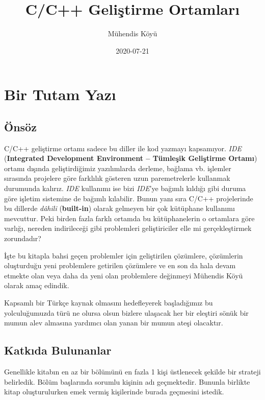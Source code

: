\documentclass[
]{book}
\title{C/C++ Geliştirme Ortamları}
\author{Mühendis Köyü}
\date{2020-07-21}
\begin{document}
\maketitle

{
\setcounter{tocdepth}{1}
\tableofcontents
}
\hypertarget{bir-tutam-yazux131}{%
\chapter{Bir Tutam Yazı}\label{bir-tutam-yazux131}}

\hypertarget{uxf6nsuxf6z}{%
\section{Önsöz}\label{uxf6nsuxf6z}}

C/C++ geliştirme ortamı sadece bu diller ile kod yazmayı kapsamıyor. \emph{IDE} (\textbf{Integrated Development Environment -- Tümleşik Geliştirme Ortamı}) ortamı dışında geliştirdiğimiz yazılımlarda derleme, bağlama vb. işlemler sırasında projelere göre farklılık gösteren uzun paremetrelerle kullanmak durumunda kalırız. \emph{IDE} kullanımı ise bizi \emph{IDE}'ye bağımlı kıldığı gibi duruma göre işletim sistemine de bağımlı kılabilir. Bunun yanı sıra C/C++ projelerinde bu dillerde \emph{dâhili} (\textbf{built-in}) olarak gelmeyen bir çok kütüphane kullanımı mevcuttur. Peki birden fazla farklı ortamda bu kütüphanelerin o ortamlara göre varlığı, nereden indirileceği gibi problemleri geliştiriciler elle mi gerçekleştirmek zorundadır?

İşte bu kitapla bahsi geçen problemler için geliştirilen çözümlere, çözümlerin oluşturduğu yeni problemlere getirilen çözümlere ve en son da hala devam etmekte olan veya daha da yeni olan problemlere değinmeyi Mühendis Köyü olarak amaç edindik.

Kapsamlı bir Türkçe kaynak olmasını hedefleyerek başladığımız bu yolculuğumuzda türü ne olursa olsun bizlere ulaşacak her bir eleştiri sönük bir mumun alev almasına yardımcı olan yanan bir mumun ateşi olacaktır.

\hypertarget{katkux131da-bulunanlar}{%
\section{Katkıda Bulunanlar}\label{katkux131da-bulunanlar}}

Genellikle kitabın en az bir bölümünü en fazla 1 kişi üstlenecek şekilde bir strateji belirledik. Bölüm başlarında sorumlu kişinin adı geçmektedir. Bununla birlikte kitap oluşturulurken emek vermiş kişilerinde burada geçmesini istedik.
\end{document}

